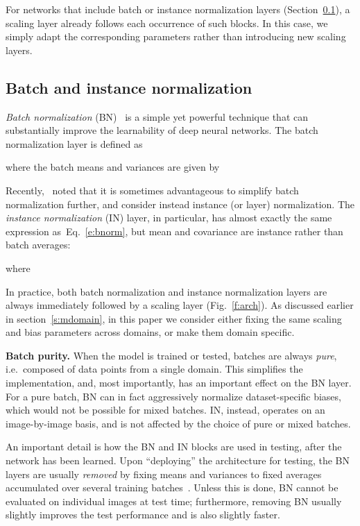 \documentclass[10pt,twocolumn,letterpaper]{article}
\renewcommand{\paragraph}[1]{\par\medskip\noindent\textbf{#1}}
\begin{document}
For networks that include batch or instance normalization layers (Section~\ref{s:norm}), a scaling layer already follows each occurrence of such blocks. In this case, we simply adapt the corresponding parameters rather than introducing new scaling layers.

\subsection{Batch and instance normalization}\label{s:norm}


\emph{Batch normalization} (BN)~\cite{ioffe15batch} is a simple yet powerful technique that can substantially improve the learnability of deep neural networks. The batch normalization layer is defined as

where the batch means  and variances  are given by


Recently,~\cite{ulyanov16instance,ba16layer} noted that it is sometimes advantageous to simplify batch normalization further, and consider instead instance (or layer) normalization. The \emph{instance normalization} (IN) layer, in particular, has almost exactly the same expression as~Eq.~\ref{e:bnorm}, but mean and covariance are instance rather than batch averages:

where


In practice, both batch normalization and instance normalization layers are always immediately followed by a scaling layer (Fig.~\ref{f:arch}). As discussed earlier in section~\ref{s:mdomain}, in this paper we consider either fixing the same scaling and bias parameters across domains, or make them domain specific.

\paragraph{Batch purity.} When the model is trained or tested, batches are always \emph{pure}, i.e.\ composed of data points from a single domain. This simplifies the implementation, and, most importantly, has an important effect on the BN layer. For a pure batch, BN can in fact aggressively normalize dataset-specific biases, which would not be possible for mixed batches. IN, instead, operates on an image-by-image basis, and is not affected by the choice of pure or mixed batches.

An important detail is how the BN and IN blocks are used in testing, after the network has been learned. Upon ``deploying'' the architecture for testing, the BN layers are usually \emph{removed} by fixing means and variances to fixed averages accumulated over several training batches~\cite{ioffe15batch}. Unless this is done, BN cannot be evaluated on individual images at test time; furthermore, removing BN usually slightly improves the test performance and is also slightly faster.
\end{document}
